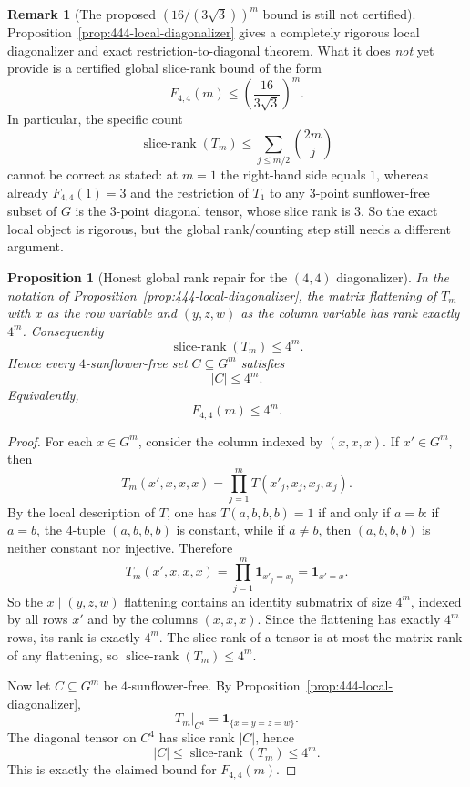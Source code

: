 \documentclass[11pt]{article}
\newtheorem{proposition}[theorem]{Proposition}
\theoremstyle{definition}
\newtheorem{remark}[theorem]{Remark}
\newcommand{\1}{\mathbf{1}}
\begin{document}
\begin{remark}[The proposed $(16/(3\sqrt 3))^m$ bound is still not certified]\label{rem:444-bound-not-certified}
Proposition~\ref{prop:444-local-diagonalizer} gives a completely rigorous local diagonalizer and exact restriction-to-diagonal theorem. What it does \emph{not} yet provide is a certified global slice-rank bound of the form
\[
F_{4,4}(m)\le \left(\frac{16}{3\sqrt 3}\right)^m.
\]
In particular, the specific count
\[
\operatorname{slice-rank}(T_m)\le \sum_{j\le m/2}\binom{2m}{j}
\]
cannot be correct as stated: at $m=1$ the right-hand side equals $1$, whereas already $F_{4,4}(1)=3$ and the restriction of $T_1$ to any $3$-point sunflower-free subset of $G$ is the $3$-point diagonal tensor, whose slice rank is $3$. So the exact local object is rigorous, but the global rank/counting step still needs a different argument.
\end{remark}

\begin{proposition}[Honest global rank repair for the $(4,4)$ diagonalizer]\label{prop:444-honest-rank}
In the notation of Proposition~\ref{prop:444-local-diagonalizer}, the matrix flattening of $T_m$ with $x$ as the row variable and $(y,z,w)$ as the column variable has rank exactly $4^m$. Consequently
\[
\operatorname{slice-rank}(T_m)\le 4^m.
\]
Hence every $4$-sunflower-free set $C\subseteq G^m$ satisfies
\[
|C|\le 4^m.
\]
Equivalently,
\[
F_{4,4}(m)\le 4^m.
\]
\end{proposition}

\begin{proof}
For each $x\in G^m$, consider the column indexed by $(x,x,x)$. If $x'\in G^m$, then
\[
T_m(x',x,x,x)=\prod_{j=1}^m T(x'_j,x_j,x_j,x_j).
\]
By the local description of $T$, one has $T(a,b,b,b)=1$ if and only if $a=b$: if $a=b$, the $4$-tuple $(a,b,b,b)$ is constant, while if $a\neq b$, then $(a,b,b,b)$ is neither constant nor injective. Therefore
\[
T_m(x',x,x,x)=\prod_{j=1}^m \mathbf 1_{x'_j=x_j}=\mathbf 1_{x'=x}.
\]
So the $x\mid (y,z,w)$ flattening contains an identity submatrix of size $4^m$, indexed by all rows $x'$ and by the columns $(x,x,x)$. Since the flattening has exactly $4^m$ rows, its rank is exactly $4^m$. The slice rank of a tensor is at most the matrix rank of any flattening, so $\operatorname{slice-rank}(T_m)\le 4^m$.

Now let $C\subseteq G^m$ be $4$-sunflower-free. By Proposition~\ref{prop:444-local-diagonalizer},
\[
T_m\big|_{C^4}=\mathbf 1_{\{x=y=z=w\}}.
\]
The diagonal tensor on $C^4$ has slice rank $|C|$, hence
\[
|C|\le \operatorname{slice-rank}(T_m)\le 4^m.
\]
This is exactly the claimed bound for $F_{4,4}(m)$.
\end{proof}
\end{document}
